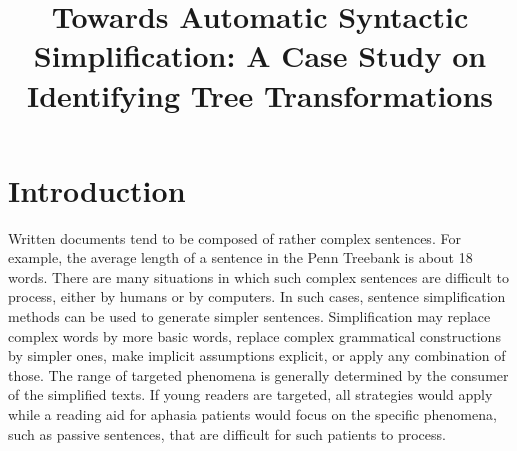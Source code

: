 \documentclass[a4paper,11pt]{article}
\title{Towards Automatic Syntactic Simplification: A Case Study on Identifying Tree Transformations}
\date{}
\begin{document}
\maketitle

%

\thispagestyle{empty}

\section{Introduction}

Written documents tend to be composed of rather complex sentences. For example, the average length of a sentence in the Penn Treebank is about 18 words. There are many situations in which such complex sentences are difficult to process, either by humans or by computers. In such cases, sentence simplification methods can be used to generate simpler sentences. Simplification may replace complex words by more basic words, replace complex grammatical constructions by simpler ones, make implicit assumptions explicit, or apply any combination of those. The range of targeted phenomena is generally determined by the consumer of the simplified texts. If young readers are targeted, all strategies would apply while a reading aid for aphasia patients would focus on the specific phenomena, such as passive sentences, that are difficult for such patients to process. 
\end{document}
